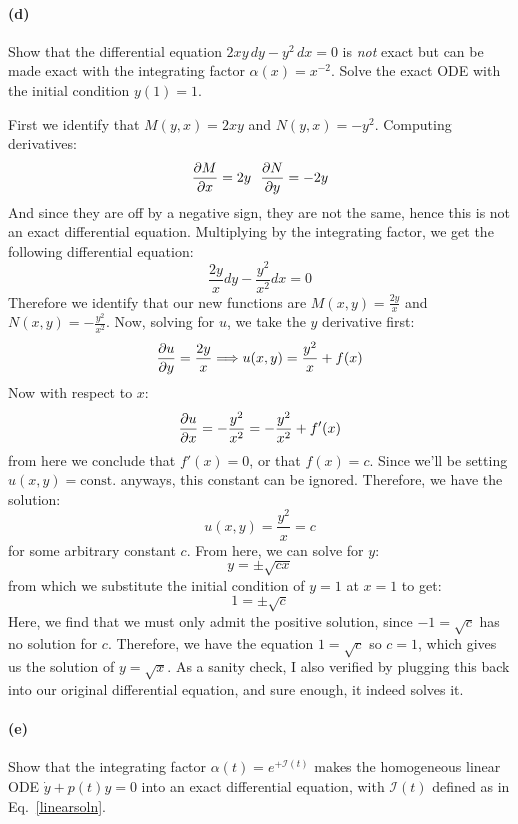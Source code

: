 \documentclass{article}
\begin{document}
\paragraph{(d)}
Show that the differential equation $2xy\,dy - y^{2}\,dx = 0$ is \emph{not} exact but can be made exact with the integrating factor $\alpha(x) = x^{-2}$.
Solve the exact ODE with the initial condition $y(1) = 1$.

\begin{solution}
	First we identify that $M(y, x) = 2xy$ and $N(y, x) = -y^2$. Computing derivatives:
	\[
		\pdv{M}{x} = 2y \ \ \pdv{N}{y} = -2y
	\] 
	And since they are off by a negative sign, they are not the same, hence this is not an exact 
	differential equation. 
	Multiplying by the integrating factor, we get the following differential equation:
	\[
	\frac{2y}{x}dy - \frac{y^2}{x^2}dx = 0
	\] 
	Therefore we identify that our new functions are $M(x, y) = \frac{2y}{x}$ and $N(x, y) = -\frac{y^2}{x^2}$. Now, solving for $u$,
	we take the $y$ derivative first:
	\[
		\pdv{u}{y} = \frac{2y}{x} \Longrightarrow u(x, y) = \frac{y^2}{x} + f(x)
	\] 
	Now with respect to $x$:
	\[
		\pdv{u}{x} = -\frac{y^2}{x^2} = -\frac{y^2}{x^2} + f'(x)
	\] 
	from here we conclude that $f'(x) = 0$, or that $f(x) = c$. Since we'll be setting $u(x, y) = \text{const.}$
	anyways, this constant can be ignored. Therefore, we have the solution:
	\[
	u(x, y) = \frac{y^2}{x} = c
	\] 
	for some arbitrary constant $c$. From here, we can solve for $y$:
	\[
	y = \pm \sqrt{cx} 
	\] 
	from which we substitute the initial condition of $y = 1$ at $x = 1$ to get:
	\[
		1 = \pm \sqrt{c}
	\] 
	Here, we find that we must only admit the positive solution, since $-1 = \sqrt{c}$ has no 
	solution for $c$. Therefore, we have the equation $1 = \sqrt{c}$ so $c = 1$, which gives us the solution
	of $y = \sqrt{x}$.
	As a sanity check, I also verified by plugging this back into our 
	original differential equation, and sure enough, it indeed solves it.
\end{solution}

\paragraph{(e)}		\extrapart
Show that the integrating factor $\alpha(t) = e^{+\mathcal{I}(t)}$ makes the homogeneous linear ODE $\dot{y} + p(t)y = 0$ 
into an exact differential equation, with $\mathcal{I}(t)$ defined as in Eq.~\ref{linearsoln}.



\endofhomework
\addfooter
\end{document}
